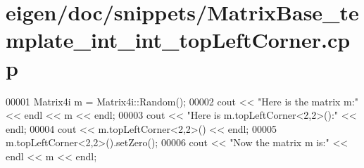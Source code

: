 \hypertarget{eigen_2doc_2snippets_2_matrix_base__template__int__int__top_left_corner_8cpp_source}{}\section{eigen/doc/snippets/\+Matrix\+Base\+\_\+template\+\_\+int\+\_\+int\+\_\+top\+Left\+Corner.cpp}
\label{eigen_2doc_2snippets_2_matrix_base__template__int__int__top_left_corner_8cpp_source}

\begin{DoxyCode}
00001 Matrix4i m = Matrix4i::Random();
00002 cout << \textcolor{stringliteral}{"Here is the matrix m:"} << endl << m << endl;
00003 cout << \textcolor{stringliteral}{"Here is m.topLeftCorner<2,2>():"} << endl;
00004 cout << m.topLeftCorner<2,2>() << endl;
00005 m.topLeftCorner<2,2>().setZero();
00006 cout << \textcolor{stringliteral}{"Now the matrix m is:"} << endl << m << endl;
\end{DoxyCode}
